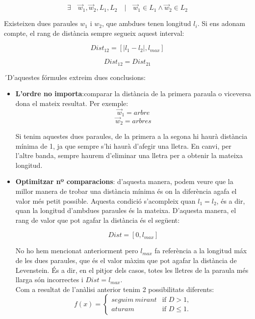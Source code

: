 \documentclass[conference]{IEEEtran}
\begin{document}
    $$\exists \quad \vec{w}_1,\vec{w}_2,L_1,L_2 \quad | \quad \vec{w}_1 \in L_1 \land \vec{w}_2 \in L_2$$

    Existeixen dues paraules $w_1$ i $w_2$, que ambdues tenen longitud $l_i$. Si ens adonam compte, el rang de distància sempre segueix aquest interval:

    $$Dist_{12}=[|l_1-l_2|,l_{max}]$$

    $$Dist_{12}=Dist_{21}$$

    ´D'aquestes fórmules extreim dues conclusions:\\

    \begin{itemize}
        \item \textbf{L'ordre no importa}:comparar la distància de la primera paraula o viceversa dona el mateix resultat. Per exemple:\\

        $$\vec{w}_1=arbre$$
        $$\vec{w}_2=arbres$$

        Si tenim aquestes dues paraules, de la primera a la segona hi haurà distància mínima de 1, ja que sempre s'hi haurà d'afegir una lletra. En canvi, per l'altre banda, sempre haurem d'eliminar una lletra per a obtenir la mateixa longitud.

        \item \textbf{Optimitzar nº comparacions}: d'aquesta manera, podem veure que la millor manera de trobar una distància mínima és on la diferència agafa el valor més petit possible. Aquesta condició s'acompleix quan $l_1=l_2$, és a dir, quan la longitud d'ambdues paraules és la mateixa. D'aquesta manera, el rang de valor que pot agafar la distància és el següent:

        $$Dist=[0,l_{max}]$$

        No ho hem mencionat anteriorment pero $l_{max}$ fa referència a la longitud máx de les dues paraules, que és el valor màxim que pot agafar la distància de Levenstein. És a dir, en el pitjor dels casos, totes les lletres de la paraula més llarga són incorrectes i $Dist=l_{max}$.\\

        Com a resultat de l'anàlisi anterior tenim 2 possibilitats diferents:
        \[
            f(x) =
            \begin{cases}
                seguim\ mirant & \text{if } D> 1, \\
                aturam & \text{if } D\leq 1.
            \end{cases}
        \]


\end{itemize}
\end{document}
